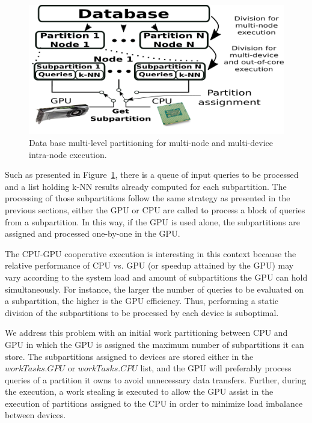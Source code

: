 \begin{figure}[htbp]
\centerline{\includegraphics[width=\columnwidth]{figs/out-of-core.png}}
\caption{Data base multi-level partitioning for multi-node and multi-device intra-node execution.}
\label{fig:switch}
\end{figure}

Such as presented in Figure~\ref{fig:switch}, there is a queue of input queries 
to be processed and a list holding k-NN results already computed for each  
subpartition. The processing of those subpartitions follow the same strategy
as presented in the previous sections, either the GPU or CPU are called to process a 
block of queries from a subpartition. In this way, if the GPU is used alone,
the subpartitions are assigned and processed one-by-one in the GPU.

The CPU-GPU cooperative execution is interesting in this context because the 
relative performance of CPU vs. GPU (or speedup attained by the GPU) may vary  
according to the system load and amount of subpartitions the GPU can hold simultaneously.
For instance, the larger the number of queries to be evaluated on a subpartition, 
the higher is the GPU efficiency. Thus, performing a static division of the 
subpartitions to be processed by each device is suboptimal. 

We address this problem with an initial work partitioning between CPU and GPU in which the
GPU is assigned the maximum number of subpartitions it can store. The subpartitions 
assigned to devices are stored either in the $workTasks.GPU$ or $workTasks.CPU$ 
list, and the GPU will preferably process queries of a partition it owns to avoid 
unnecessary data transfers. Further, during the execution, a work stealing is
executed to allow the GPU assist in the execution of partitions assigned to the CPU in order
to minimize load imbalance between devices.


